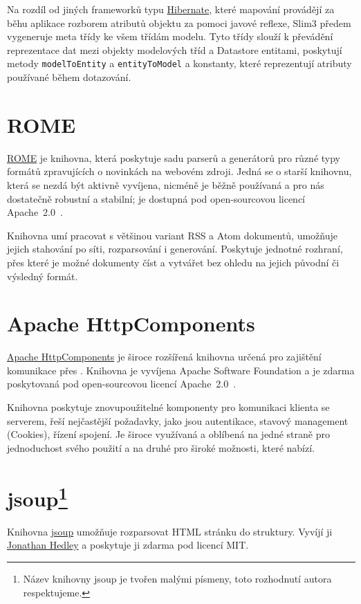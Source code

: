 Na rozdíl od jiných  frameworků typu \href{http://www.hibernate.org/}{Hibernate}, které mapování provádějí za běhu aplikace rozborem atributů objektu za pomoci javové reflexe, Slim3 předem vygeneruje meta třídy ke všem třídám modelu.
Tyto třídy slouží k převádění reprezentace dat mezi objekty modelových tříd a Datastore entitami, poskytují metody \verb|modelToEntity| a \verb|entityToModel| a konstanty, které reprezentují atributy používané během dotazování.

\section{ROME}
\href{https://rometools.jira.com/wiki/display/ROME/Home}{ROME} je knihovna, která poskytuje sadu parserů a generátorů pro různé typy formátů zpravujících o novinkách na webovém zdroji.
Jedná se o starší knihovnu, která se nezdá být aktivně vyvíjena, nicméně je běžně používaná a pro nás dostatečně robustní a stabilní; je dostupná pod open-sourcovou licencí Apache~2.0~\cite{apache20}.

Knihovna umí pracovat s většinou variant RSS a Atom dokumentů, umožňuje jejich stahování po síti, rozparsování i generování.
Poskytuje jednotné rozhraní, přes které je možné dokumenty číst a vytvářet bez ohledu na jejich původní či výsledný formát.

\section{Apache HttpComponents}
\href{http://hc.apache.org/}{Apache HttpComponents} je široce rozšířená knihovna určená pro zajištění komunikace přes .
Knihovna je vyvíjena Apache Software Foundation a je zdarma poskytovaná pod open-sourcovou licencí Apache~2.0~\cite{apache20}.

Knihovna poskytuje znovupoužitelné komponenty pro komunikaci klienta se serverem, řeší nejčastější požadavky, jako jsou autentikace, stavový management (Cookies), řízení spojení.
Je široce využívaná a oblíbená na jedné straně pro jednoduchost svého použití a na druhé pro široké možnosti, které nabízí.

\section{\texorpdfstring{jsoup\footnote{Název knihovny jsoup je tvořen malými písmeny, toto rozhodnutí autora respektujeme.}}{jsoup}}
Knihovna \href{http://jsoup.org/}{jsoup} umožňuje rozparsovat HTML stránku do  struktury.
Vyvíjí ji \href{mailto:jonathan@hedley.net}{Jonathan Hedley} a poskytuje ji zdarma pod licencí MIT.

